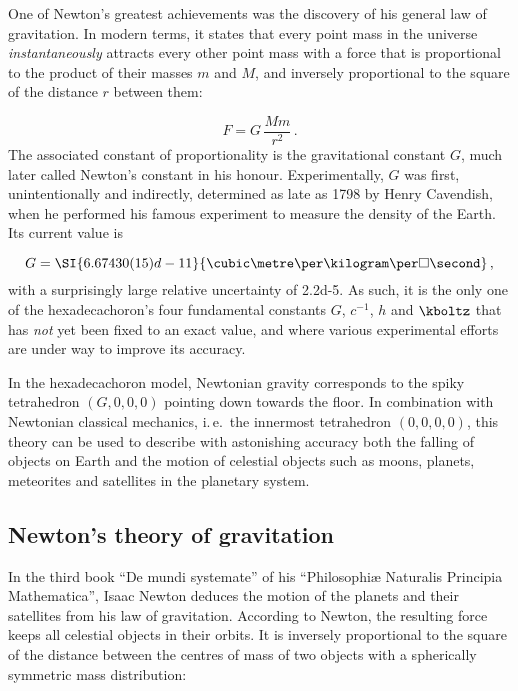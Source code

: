 
\newpage {}
\label{sec:1000}

One of Newton's greatest achievements was the discovery of his general law of gravitation. In modern terms, it states that every point mass in the universe \emph{instantaneously} attracts every other point mass with a force that is proportional to the product of their masses $m$ and $M$, and inversely proportional to the square of the distance $r$ between them:

\begin{equation*}\label{eq:gravitation}
  F=G\,\frac{Mm}{r^2}\,.
\end{equation*}
%
The associated constant of proportionality is the gravitational constant $G$, much later called Newton's constant in his honour. Experimentally, $G$ was first, unintentionally and indirectly, determined as late as 1798 by Henry Cavendish, when he performed his famous experiment to measure the density of the Earth. Its current value is

\begin{equation*}
  G = \SI{6.67430(15)d-11}{\cubic\metre\per\kilogram\per\square\second}\,,
\end{equation*}
%
with a surprisingly large relative uncertainty of \num{2.2d-5}. As such, it is the only one of the hexadecachoron's four fundamental constants $G$, $c^{-1}$, $h$ and $\kboltz$ that has \textit{not} yet been fixed to an exact value, and where various experimental efforts are under way to improve its accuracy.

In the hexadecachoron model, Newtonian gravity corresponds to the spiky tetrahedron $(G,0,0,0)$  pointing down towards the floor. In combination with Newtonian classical mechanics, i.\,e.\ the innermost tetrahedron $(0,0,0,0)$, this theory can be used to describe with astonishing accuracy both the falling of objects on Earth and the motion of celestial objects such as moons, planets, meteorites and satellites in the planetary system.


\subsection*{Newton's theory of gravitation}

In the third book \enquote{De mundi systemate} of his \enquote{Philosophiæ Naturalis Principia Mathematica}, Isaac Newton deduces the motion of the planets and their satellites from his law of gravitation. According to Newton, the resulting force keeps all celestial objects in their orbits. It is inversely proportional to the square of the distance between the centres of mass of two objects with a spherically symmetric mass distribution:

